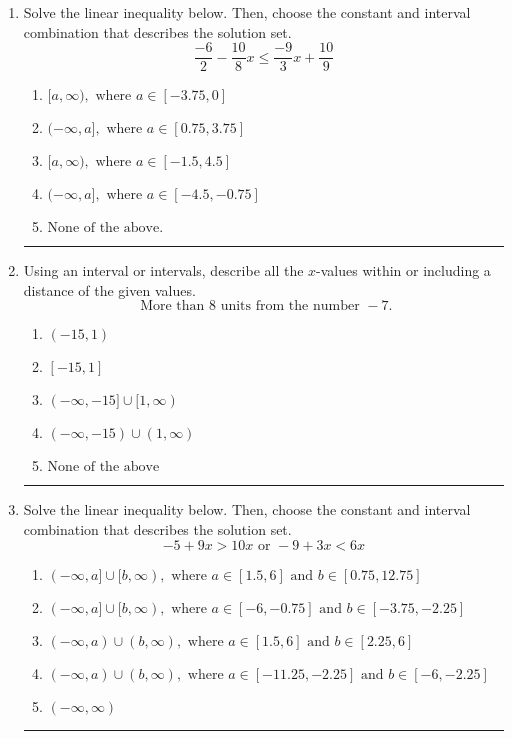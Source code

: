 \documentclass[14pt]{extbook}
\newcommand{\litem}[1]{\item#1\hspace*{-1cm}\rule{\textwidth}{0.4pt}}
\begin{document}
\begin{enumerate}
\litem{
Solve the linear inequality below. Then, choose the constant and interval combination that describes the solution set.\[ \frac{-6}{2} - \frac{10}{8} x \leq \frac{-9}{3} x + \frac{10}{9} \]\begin{enumerate}[label=\Alph*.]
\item \( [a, \infty), \text{ where } a \in [-3.75, 0] \)
\item \( (-\infty, a], \text{ where } a \in [0.75, 3.75] \)
\item \( [a, \infty), \text{ where } a \in [-1.5, 4.5] \)
\item \( (-\infty, a], \text{ where } a \in [-4.5, -0.75] \)
\item \( \text{None of the above}. \)

\end{enumerate} }
\litem{
Using an interval or intervals, describe all the $x$-values within or including a distance of the given values.\[ \text{ More than } 8 \text{ units from the number } -7. \]\begin{enumerate}[label=\Alph*.]
\item \( (-15, 1) \)
\item \( [-15, 1] \)
\item \( (-\infty, -15] \cup [1, \infty) \)
\item \( (-\infty, -15) \cup (1, \infty) \)
\item \( \text{None of the above} \)

\end{enumerate} }
\litem{
Solve the linear inequality below. Then, choose the constant and interval combination that describes the solution set.\[ -5 + 9 x > 10 x \text{ or } -9 + 3 x < 6 x \]\begin{enumerate}[label=\Alph*.]
\item \( (-\infty, a] \cup [b, \infty), \text{ where } a \in [1.5, 6] \text{ and } b \in [0.75, 12.75] \)
\item \( (-\infty, a] \cup [b, \infty), \text{ where } a \in [-6, -0.75] \text{ and } b \in [-3.75, -2.25] \)
\item \( (-\infty, a) \cup (b, \infty), \text{ where } a \in [1.5, 6] \text{ and } b \in [2.25, 6] \)
\item \( (-\infty, a) \cup (b, \infty), \text{ where } a \in [-11.25, -2.25] \text{ and } b \in [-6, -2.25] \)
\item \( (-\infty, \infty) \)


\end{enumerate}}
\end{enumerate}
\end{document}
